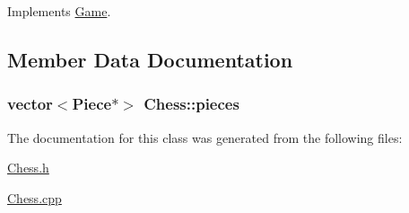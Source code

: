 Implements \hyperlink{classGame_a49067dcf360cfe353b9a99910136ac26}{Game}.



\subsection{Member Data Documentation}
\hypertarget{classChess_af1095b2af2920e5d12cf133dd88cf30e}{}
\subsubsection[{pieces}]{\setlength{\rightskip}{0pt plus 5cm}vector$<${\bf Piece}$\ast$$>$ Chess\+::pieces\hspace{0.3cm}{\ttfamily [private]}}\label{classChess_af1095b2af2920e5d12cf133dd88cf30e}


The documentation for this class was generated from the following files\+:\begin{DoxyCompactItemize}
\item 
\hyperlink{Chess_8h}{Chess.\+h}\item 
\hyperlink{Chess_8cpp}{Chess.\+cpp}\end{DoxyCompactItemize}
